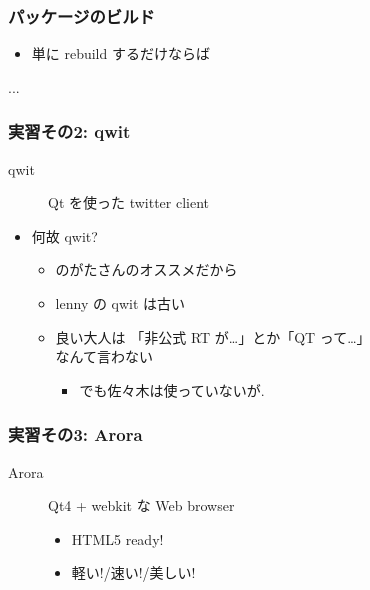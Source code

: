 \documentclass[cjk,dvipdfmx,12pt,%
hyperref={bookmarks=true,bookmarksnumbered=true,bookmarksopen=false,%
colorlinks=false,%
pdftitle={野良ビルドから始めるパッケージ作成},%
pdfauthor={佐々木洋平},%
pdfsubject={第37回関西Debian勉強会 at OSC 2010 Kansai$@$kyoto},%
}]{beamer}
\begin{document}
\begin{frame}[fragile]
\frametitle{パッケージのビルド}

\begin{itemize}
\item 単に rebuild するだけならば
\end{itemize}

\begin{commandline}
...
\end{commandline}


\end{frame}




\begin{frame}[fragile]
\frametitle{実習その2: qwit}


\begin{description}
\item[qwit] \mbox{}

Qt を使った twitter client
\end{description}

\begin{itemize}
\item 何故 qwit?

\begin{itemize}
\item のがたさんのオススメだから
\item lenny の qwit は古い
\item 良い大人は
「非公式 RT が\dots{}」とか「QT って\dots{}」\\なんて言わない

\begin{itemize}
\item でも佐々木は使っていないが.
\end{itemize}
\end{itemize}
\end{itemize}

\end{frame}








\begin{frame}[fragile]
\frametitle{実習その3: Arora}


\begin{description}
\item[Arora] \mbox{}

Qt4 + webkit な Web browser

\begin{itemize}
\item HTML5 ready!
\item 軽い!/速い!/美しい!
\end{itemize}
\end{description}

\end{frame}
\end{document}
